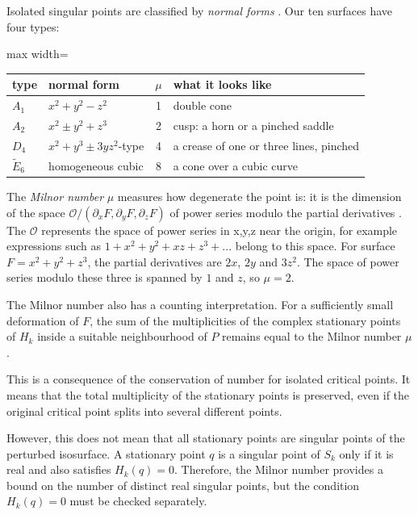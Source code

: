 \documentclass[12pt, a4paper]{article}
\theoremstyle{plain}
\theoremstyle{definition}
\theoremstyle{remark}
\theoremstyle{definition}
\begin{document}
Isolated singular points are classified by \emph{normal forms}
\cite{arnold2012singularities}. Our ten surfaces have four types:
\begin{center}
\small
\begin{adjustbox}{max width=\textwidth}
\begin{tabular}{l l c l}
\toprule
type & normal form & $\mu$ & what it looks like \\
\midrule
$A_1$ & $x^2+y^2-z^2$ & 1 & double cone \\
$A_2$ & $x^2\pm y^2+z^3$ & 2 & cusp: a horn or a pinched saddle \\
$D_4$ & $x^2+y^3\pm 3yz^2$-type & 4 & a crease of one or three lines, pinched \\
$\tilde E_6$ & homogeneous cubic & 8 & a cone over a cubic curve \\
\bottomrule
\end{tabular}
\end{adjustbox}
\end{center}
The \emph{Milnor number} $\mu$ measures how degenerate the point is: it is the
dimension of the space $\mathcal O/(\partial_xF,\partial_yF,\partial_zF)$ of power
series modulo the partial derivatives \cite{milnor1968singular}. The $\mathcal O$ represents the space of power series in x,y,z near the origin, for example expressions such as $1+x^2+y^2+xz+z^3+...$ belong to this space.
For surface $F=x^2+y^2+z^3$, the partial derivatives are $2x$, $2y$ and $3z^2$. The space of power series modulo these three is spanned by $1$ and $z$, so $\mu=2$.


The Milnor number also has a counting interpretation. For a
sufficiently small deformation of $F$, the sum of the
multiplicities of the complex stationary points of $H_k$
inside a suitable neighbourhood of $P$ remains equal to
the Milnor number $\mu$.

This is a consequence of the conservation of number for
isolated critical points. It means that the total
multiplicity of the stationary points is preserved, even
if the original critical point splits into several
different points.

However, this does not mean that all stationary points are
singular points of the perturbed isosurface. A stationary
point $q$ is a singular point of $S_k$ only if it is real
and also satisfies $H_k(q)=0$. Therefore, the Milnor number
provides a bound on the number of distinct real singular
points, but the condition $H_k(q)=0$ must be checked
separately.
\cite{milnor1968singular}
\end{document}
